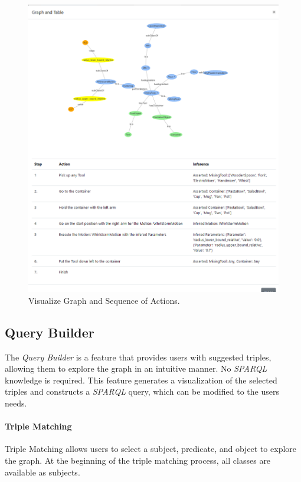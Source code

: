 \begin{figure}[H]
    \centering
    \includegraphics[scale=0.5]{Graphics/new_inference_graph.png}
    \caption{Visualize Graph and Sequence of Actions.}
    \label{fig:graph_inferred}
\end{figure}
\subsection{Query Builder}
The \textit{Query Builder} is a feature that provides users with suggested triples, allowing them to explore the graph in an intuitive manner.
No \textit{SPARQL} knowledge is required. This feature generates a visualization of the selected triples and constructs a \textit{SPARQL} query, 
which can be modified to the users needs.

\paragraph{Triple Matching}
Triple Matching allows users to select a subject, predicate, and object to explore the graph. 
At the beginning of the triple matching process, all classes are available as subjects. 

